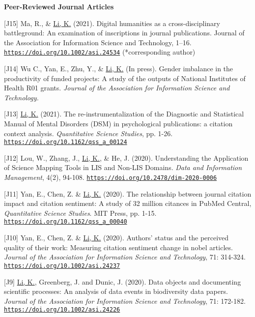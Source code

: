 \documentclass[margin, 10pt]{res} %
\begin{document}
\begin{resume}
\textbf{Peer-Reviewed Journal Articles}

[J15] Ma, R., \& \underline{Li, K.} (2021). Digital humanities as a cross-disciplinary battleground: An examination of inscriptions in journal publications. Journal of the Association for Information Science and Technology, 1–16. \href{https://doi.org/10.1002/asi.24534}{\nolinkurl{https://doi.org/10.1002/asi.24534}} (*corresponding author)

[J14] Wu C., Yan, E., Zhu, Y., \& \underline{Li, K.} (In press). Gender imbalance in the productivity of funded projects: A study of the outputs of National Institutes of Health R01 grants. \textit{Journal of the Association for Information Science and Technology.}

[J13] \underline{Li, K.} (2021). The re-instrumentalization of the Diagnostic and Statistical Manual of Mental Disorders (DSM) in psychological publications: a citation context analysis. \textit{Quantitative Science Studies}, pp. 1-26. \href{https://doi.org/10.1162/qss_a_00124}{\nolinkurl{https://doi.org/10.1162/qss_a_00124}}

[J12] Lou, W., Zhang, J., \underline{Li, K.}, \& He, J. (2020). Understanding the Application of Science Mapping Tools in LIS and Non-LIS Domains. \textit{Data and Information Management}, 4(2), 94-108. \href{https://doi.org/10.2478/dim-2020-0006}{\nolinkurl{https://doi.org/10.2478/dim-2020-0006}}

[J11] Yan, E., Chen, Z. \& \underline{Li, K.} (2020). The relationship between journal citation impact and citation sentiment: A study of 32 million citances in PubMed Central, \textit{Quantitative Science Studies}. MIT Press, pp. 1-15. \href{https://doi.org/10.1162/qss\_a\_00040}{\nolinkurl{https://doi.org/10.1162/qss_a_00040}}

[J10] Yan, E., Chen, Z. \& \underline{Li, K.} (2020). Authors' status and the perceived quality of their work: Measuring citation sentiment change in nobel articles. \textit{Journal of the Association for Information Science and Technology}, 71: 314-324. \href{https://doi.org/10.1002/asi.24237}{\nolinkurl{https://doi.org/10.1002/asi.24237}}

[J9] \underline{Li, K.}, Greenberg, J. and Dunic, J. (2020). Data objects and documenting scientific processes: An analysis of data events in biodiversity data papers. \textit{Journal of the Association for Information Science and Technology}, 71: 172-182. \href{https://doi.org/10.1002/asi.24226}{\nolinkurl{https://doi.org/10.1002/asi.24226}}


\end{resume}
\end{document}
